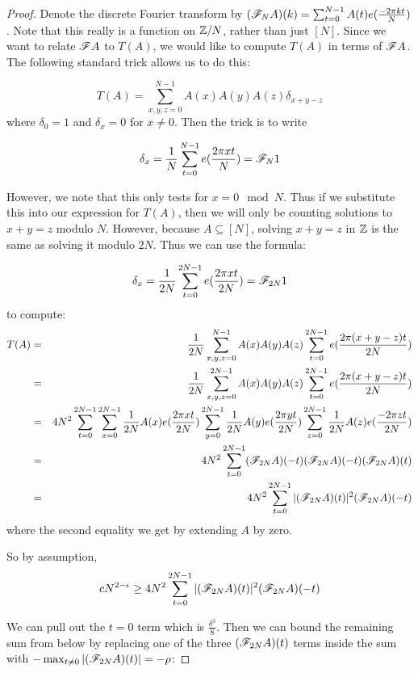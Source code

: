 \documentclass{report}
\theoremstyle{remark}
\numberwithin{equation}{section}
\begin{document}
\begin{proof}
  Denote the discrete Fourier transform by
  $(\mathscr{F}_N A)(k) = \sum_{t=0}^{N-1} A(t) e(\frac{-2\pi k t}{N})$.
  Note that this really is a function on $\mathbb{Z}/N$, rather than just
  $[N]$.  Since we want to relate $\mathscr{F} A$ to $T(A)$, we would like to
  compute $T(A)$ in terms of $\mathscr{F} A$.  The following standard trick
  allows us to do this: 

  \[T(A) = \sum_{x, y, z = 0}^{N-1} A(x)A(y)A(z)\delta_{x+y-z}\]
  where $\delta_0 = 1$ and $\delta_x = 0$ for $x \neq 0$.  Then the
  trick is to write 

  \[\delta_x = \frac{1}{N} \sum_{t=0}^{N-1} e(\frac{2\pi x t}{N}) = \mathscr{F}_N 1\]

  However, we note that this only tests for $x = 0 \mod{N}$.  Thus if
  we substitute this into our expression for $T(A)$, then we will only
  be counting solutions to $x+y=z$ modulo $N$.  However, because
  $A \subseteq [N]$, solving $x+y=z$ in $\mathbb{Z}$ is the same as solving it
  modulo $2N$.  Thus we can use the formula:

  \[\delta_x = \frac{1}{2N} \sum_{t=0}^{2N-1} e(\frac{2\pi x t}{2N}) = \mathscr{F}_{2N} 1\]
  to compute: 
  \begin{eqnarray*}
    T(A) &=& \frac{1}{2N}\sum_{x, y, z = 0}^{N-1} A(x)A(y)A(z)\sum_{t=0}^{2N-1}
             e(\frac{2\pi (x+y-z) t}{2N})\\
         &=& \frac{1}{2N}\sum_{x, y, z = 0}^{2N-1} A(x)A(y)A(z)\sum_{t=0}^{2N-1}
             e(\frac{2\pi (x+y-z) t}{2N})\\
         &=& 4N^2 \sum_{t=0}^{2N-1}
             \sum_{x=0}^{2N-1} \frac{1}{2N} A(x)e(\frac{2\pi x t}{2N}) 
             \sum_{y=0}^{2N-1} \frac{1}{2N} A(y)e(\frac{2\pi y t}{2N}) 
             \sum_{z=0}^{2N-1} \frac{1}{2N} A(z)e(\frac{-2\pi z t}{2N})\\
         &=& 4 N^2 \sum_{t=0}^{2N-1} (\mathscr{F}_{2N}A)(-t)(\mathscr{F}_{2N}A)(-t)(\mathscr{F}_{2N}A)(t)\\
         &=& 4 N^2 \sum_{t=0}^{2N-1} |(\mathscr{F}_{2N}A)(t)|^2(\mathscr{F}_{2N}A)(-t)
  \end{eqnarray*}
  where the second equality we get by extending $A$ by zero.  
  
  So by assumption, 
  \[cN^{2-\epsilon} \geq 4 N^2 \sum_{t=0}^{2N-1} |(\mathscr{F}_{2N}A)(t)|^2(\mathscr{F}_{2N}A)(-t)\]

  We can pull out the $t = 0$ term which is $\frac{\delta^3}{8}$.  Then we can
  bound the remaining sum from below by replacing one of the three
  $(\mathscr{F}_{2N} A)(t)$ terms inside the sum with
  $-\max_{t\neq 0} |(\mathscr{F}_{2N} A)(t)| = -\rho$:
  

\end{proof}
\end{document}
